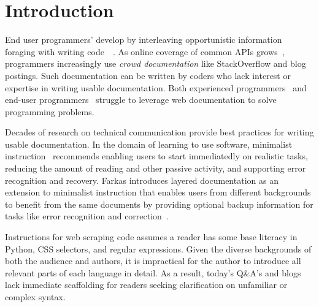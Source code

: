 \section{Introduction}

End user programmers' develop by interleaving opportunistic information foraging with writing code~\cite{brandt_two_2009}~\cite{brandt_example-centric_2010}.
As online coverage of common APIs grows~\cite{parnin_measuring_2011}, programmers increasingly use \emph{crowd documentation} like StackOverflow and blog postings.
Such documentation can be written by coders who lack interest or expertise in writing usable documentation.
Both experienced programmers~\cite{duala-ekoko_asking_2012} and end-user programmers~\cite{dorn_lost_2013}\cite{dorn_learning_2010} struggle to leverage web documentation to solve programming problems.

Decades of research on technical communication provide best practices for writing usable documentation.
In the domain of learning to use software, minimalist instruction~\cite{carroll_nurnberg_1990} recommends enabling users to start immediatedly on realistic tasks, reducing the amount of reading and other passive activity, and supporting error recognition and recovery.
Farkas introduces layered documentation as an extension to minimalist instruction that enables users from different backgrounds to benefit from the same documents by providing optional backup information for tasks like error recognition and correction~\cite{farkas_layering_1998}.

Instructions for web scraping code assumes a reader has some base literacy in Python, CSS selectors, and regular expressions.
Given the diverse backgrounds of both the audience and authors, it is impractical for the author to introduce all relevant parts of each language in detail.
As a result, today's Q\&A's and blogs lack immediate scaffolding for readers seeking clarification on unfamiliar or complex syntax.

